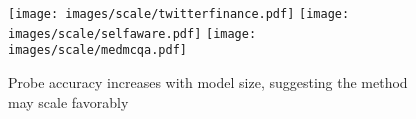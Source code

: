 \begin{figure}[h]
    \centering \texttt{[image: images/scale/twitterfinance.pdf]}
    \texttt{[image: images/scale/selfaware.pdf]}
    \texttt{[image: images/scale/medmcqa.pdf]}
    \caption{Probe accuracy increases with model size, suggesting the method may scale favorably}
    \label{fig:scale}
\end{figure}